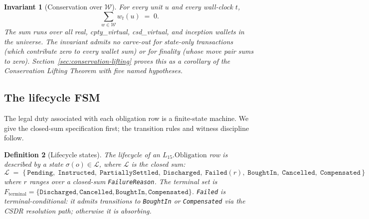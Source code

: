 \documentclass[11pt,a4paper]{article}
\newtheorem{definition}{Definition}[section]
\newtheorem{invariant}[definition]{Invariant}
\begin{document}
\begin{invariant}[Conservation over $\mathcal{W}$]
\label{inv:conservation}
For every unit $u$ and every wall-clock $t$,
\[
\sum_{w \in \mathcal{W}} w_t(u) \;=\; 0.
\]
The sum runs over all real, cpty\_virtual, csd\_virtual, and inception wallets in the universe. The invariant admits no carve-out for state-only transactions (which contribute zero to every wallet sum) or for finality (whose move pair sums to zero). Section~\ref{sec:conservation-lifting} proves this as a corollary of the Conservation Lifting Theorem with five named hypotheses.
\end{invariant}

\subsection{The lifecycle FSM}
\label{sec:lifecycle-fsm}

The legal duty associated with each obligation row is a finite-state machine. We give the closed-sum specification first; the transition rules and witness discipline follow.

\begin{definition}[Lifecycle states]
\label{def:lifecycle-states}
The lifecycle of an $L_{15}.\mathrm{Obligation}$ row is described by a state $\sigma(o) \in \mathcal{L}$, where $\mathcal{L}$ is the closed sum:
\[
\mathcal{L} \;=\; \{\,\mathtt{Pending},\; \mathtt{Instructed},\; \mathtt{PartiallySettled},\; \mathtt{Discharged},\; \mathtt{Failed}(r),\; \mathtt{BoughtIn},\; \mathtt{Cancelled},\; \mathtt{Compensated}\,\}
\]
where $r$ ranges over a closed-sum \texttt{FailureReason}. The terminal set is $F_{\mathrm{terminal}} = \{\mathtt{Discharged}, \mathtt{Cancelled}, \mathtt{BoughtIn}, \mathtt{Compensated}\}$. \texttt{Failed} is terminal-conditional: it admits transitions to \texttt{BoughtIn} or \texttt{Compensated} via the CSDR resolution path; otherwise it is absorbing.
\end{definition}
\end{document}

